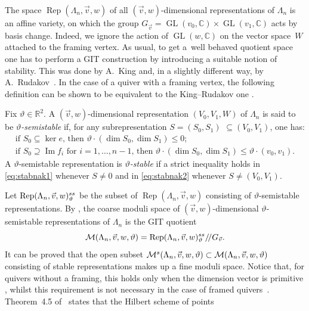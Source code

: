 \documentclass[11pt]{article}
\numberwithin{equation}{section}
\numberwithin{equation}{section}
\begin{document}
The space $\operatorname{Rep}(\Lambda_n ,\vec{v},w)$ of all $(\vec{v},w)$-dimensional representations of $\Lambda_n$
is an affine variety, on which the group $G_{\vec{v}}=\operatorname{GL}(v_0,\mathbb{C})\times\operatorname{GL}(v_1,\mathbb{C})$ acts by basis change. Indeed, we ignore the action of $\operatorname{GL}(w,\mathbb{C})$ on the vector space~$W$ attached to the framing vertex. As usual, to get a~well behaved quotient space one has to perform a GIT construction by introducing a suitable notion of stability. This was done by A.~King \cite{KiQ} and, in a slightly different way, by A.~Rudakov~\cite{Rud97}. In the case of a quiver with a framing vertex, the following definition can be shown to be equivalent to the King--Rudakov one \cite{blr, CrBo}.
\begin{Definition}\label{def:stabil}
 Fix $\vartheta\in\mathbb R^2$. A $(\vec{v},w)$-dimensional representation {$(V_0,V_1,W)$} of $\Lambda_n$ is said to be \emph{$\vartheta$-semistable} if, for any subrepresentation $S=(S_0,S_1)$ {$\subseteq (V_0,V_1)$}, one has:
\begin{gather}
 \text{if $S_0\subseteq \ker e$, then $\vartheta\cdot(\dim S_0,\dim S_1)\leq0$} ;\label{eq:stabnak1}\\[5pt]
 \text{if $S_0\supseteq \operatorname{Im} f_i$ for $i=1,\dots,n-1$, then $\vartheta\cdot(\dim S_0,\dim S_1)\leq\vartheta\cdot(v_0,v_1)$} .\label{eq:stabnak2}
\end{gather}
A $\vartheta$-semistable representation is \emph{$\vartheta$-stable} if a strict inequality holds in \eqref{eq:stabnak1} whenever $S\neq0$ and
in \eqref{eq:stabnak2} whenever $S\neq(V_0,V_1)$.
\end{Definition}
Let $\operatorname{Rep}(\Lambda_n, \vec{v}, w)^{\rm ss}_\vartheta$ be the subset of $\operatorname{Rep}(\Lambda_n,\vec{v},w)$ consisting of $\vartheta$-semistable representations. By \cite[Proposition 5.2]{KiQ}, the coarse moduli space of
$(\vec{v},w)$-dimensional $\vartheta$-semistable representations of $\Lambda_n$ is the GIT quotient
\[\mathcal{M} (\Lambda_n,\vec{v},w, \vartheta)=\operatorname{Rep}(\Lambda_n, \vec{v}, w)^{\rm ss}_\vartheta/\!/ G_{\vec{v}} .\]
It can be proved that the open subset $\mathcal{M}^{\rm s} (\Lambda_n,\vec{v},w, \vartheta) \subset \mathcal{M} (\Lambda_n,\vec{v},w, \vartheta)$
consisting of stable representations makes up a fine moduli space. Notice that, for quivers without a framing, this
holds only when the dimension vector is primitive \cite[Proposition~5.3]{KiQ}, whilst this requirement is not necessary in the case of framed quivers~\cite{CrBo}. Theorem~4.5 of~\cite{bblr} states that the Hilbert scheme of points
\end{document}
